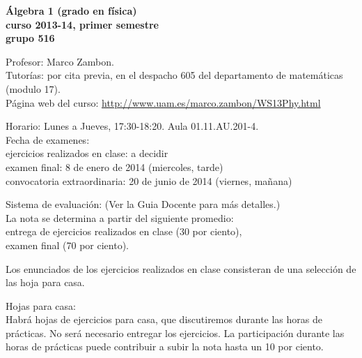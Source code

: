 \documentclass[12pt,a4paper]{amsart}
\begin{document}
\thispagestyle{empty}
\vspace*{-2cm}

 
\noindent
\begin{center}\Large\bfseries\textsf{\'Algebra 1 (grado en f\'isica)\\   curso 2013-14, primer semestre\\
	grupo 516}
\end{center}
\hrulefill{}
 
\noindent
{\sffamily    
Profesor:} Marco Zambon. \\
{\sffamily Tutor\'ias:} por cita previa, en el despacho 605 del departamento de matem\'aticas (modulo 17). \\
{\sffamily P\'agina web del curso:} \url{http://www.uam.es/marco.zambon/WS13Phy.html}

\noindent\hrulefill{}  

\noindent
{\sffamily Horario:} Lunes a Jueves, 17:30-18:20. Aula  01.11.AU.201-4.   \\ 
\noindent
{\sffamily  Fecha de examenes:} \\ 
ejercicios realizados en clase: a decidir\\
examen final: 8 de enero de 2014 (miercoles, tarde)\\
convocatoria extraordinaria:  20 de junio de 2014 (viernes, ma\~nana) 

\noindent\hrulefill{}  

\noindent
{\sffamily  Sistema de evaluaci\'on:}  (Ver la Guia Docente para m\'as detalles.)\\
La nota se determina a partir del siguiente promedio:\\
entrega de ejercicios realizados en clase (30 por ciento),\\
examen final (70 por ciento).

Los enunciados de los ejercicios realizados en clase consisteran de una selecci\'on de las hoja   para casa.

\noindent\hrulefill{}  

\noindent
{\sffamily  Hojas para casa:}\\
Habr\'a  hojas de ejercicios para casa, que discutiremos durante las horas de pr\'acticas. No ser\'a necesario entregar los ejercicios.
La participaci\'on durante las horas de pr\'acticas puede contribuir a subir la nota hasta un 10 por ciento.
\end{document}
